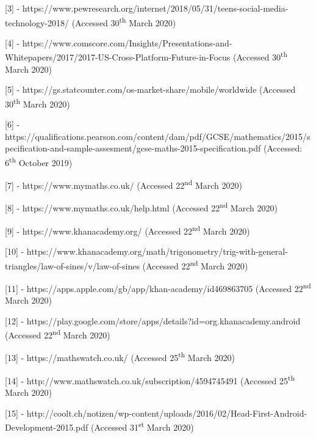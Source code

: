 \documentclass{article}
\begin{document}
[3] - https://www.pewresearch.org/internet/2018/05/31/teens-social-media-technology-2018/ (Accessed 30\textsuperscript{th} March 2020) \par

[4] - https://www.comscore.com/Insights/Presentations-and-Whitepapers/2017/2017-US-Cross-Platform-Future-in-Focus (Accessed 30\textsuperscript{th} March 2020) \par

[5] - https://gs.statcounter.com/os-market-share/mobile/worldwide (Accessed 30\textsuperscript{th} March 2020) \par

[6] - https://qualifications.pearson.com/content/dam/pdf/GCSE/mathematics/2015/specification-and-sample-assesment/gcse-maths-2015-specification.pdf (Accessed: 6\textsuperscript{th} October 2019) \par

[7] - https://www.mymaths.co.uk/ (Accessed 22\textsuperscript{nd} March 2020) \par

[8] - https://www.mymaths.co.uk/help.html (Accessed 22\textsuperscript{nd} March 2020) \par

[9] - https://www.khanacademy.org/ (Accessed 22\textsuperscript{nd} March 2020) \par

[10] - https://www.khanacademy.org/math/trigonometry/trig-with-general-triangles/law-of-sines/v/law-of-sines (Accessed 22\textsuperscript{nd} March 2020) \par

[11] - https://apps.apple.com/gb/app/khan-academy/id469863705 (Accessed 22\textsuperscript{nd} March 2020) \par

[12] - https://play.google.com/store/apps/details?id=org.khanacademy.android (Accessed 22\textsuperscript{nd} March 2020) \par

[13] - https://mathswatch.co.uk/ (Accessed 25\textsuperscript{th} March 2020) \par

[14] - http://www.mathswatch.co.uk/subscription/4594745491 (Accessed 25\textsuperscript{th} March 2020) \par

[15] - http://coolt.ch/notizen/wp-content/uploads/2016/02/Head-First-Android-Development-2015.pdf (Accessed 31\textsuperscript{st} March 2020) \par
\end{document}
